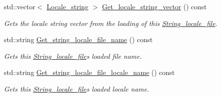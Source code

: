 \begin{DoxyCompactItemize}
std\+::vector$<$ \hyperlink{structjetfuel_1_1locale_1_1Locale__string}{Locale\+\_\+string} $>$ \hyperlink{classjetfuel_1_1locale_1_1String__locale__file_a381a3de2e2b590fcbd6835fa7f214b11}{Get\+\_\+locale\+\_\+string\+\_\+vector} () const
\begin{DoxyCompactList}\small\item\em Gets the locale string vector from the loading of this \hyperlink{classjetfuel_1_1locale_1_1String__locale__file}{String\+\_\+locale\+\_\+file}. \end{DoxyCompactList}\item 
std\+::string \hyperlink{classjetfuel_1_1locale_1_1String__locale__file_a5f632b2d522da339f8a21e1bf808339e}{Get\+\_\+string\+\_\+locale\+\_\+file\+\_\+name} () const
\begin{DoxyCompactList}\small\item\em Gets this \hyperlink{classjetfuel_1_1locale_1_1String__locale__file}{String\+\_\+locale\+\_\+file}\textquotesingle{}s loaded file name. \end{DoxyCompactList}\item 
std\+::string \hyperlink{classjetfuel_1_1locale_1_1String__locale__file_a009cba27cfdd2cf3d0eb3dbefdfb9e37}{Get\+\_\+string\+\_\+locale\+\_\+file\+\_\+locale\+\_\+name} () const
\begin{DoxyCompactList}\small\item\em Gets this \hyperlink{classjetfuel_1_1locale_1_1String__locale__file}{String\+\_\+locale\+\_\+file}\textquotesingle{}s loaded locale name. \end{DoxyCompactList}\end{DoxyCompactItemize}
